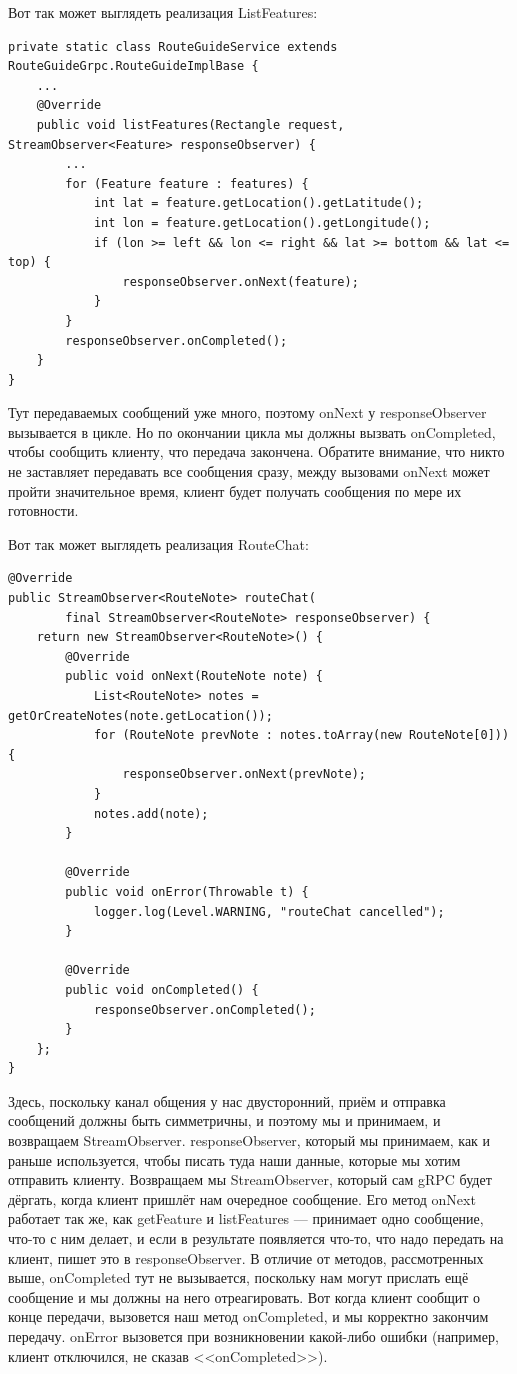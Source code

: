 \documentclass{../../text-style}
\begin{document}
Вот так может выглядеть реализация ListFeatures:

\begin{verbatim}
private static class RouteGuideService extends RouteGuideGrpc.RouteGuideImplBase {
    ...
    @Override
    public void listFeatures(Rectangle request, StreamObserver<Feature> responseObserver) {
        ...
        for (Feature feature : features) {
            int lat = feature.getLocation().getLatitude();
            int lon = feature.getLocation().getLongitude();
            if (lon >= left && lon <= right && lat >= bottom && lat <= top) {
                responseObserver.onNext(feature);
            }
        }
        responseObserver.onCompleted();
    }
}
\end{verbatim}

Тут передаваемых сообщений уже много, поэтому onNext у responseObserver вызывается в цикле. Но по окончании цикла мы должны вызвать onCompleted, чтобы сообщить клиенту, что передача закончена. Обратите внимание, что никто не заставляет передавать все сообщения сразу, между вызовами onNext может пройти значительное время, клиент будет получать сообщения по мере их готовности.

Вот так может выглядеть реализация RouteChat:

\begin{verbatim}
@Override
public StreamObserver<RouteNote> routeChat(
        final StreamObserver<RouteNote> responseObserver) {
    return new StreamObserver<RouteNote>() {
        @Override
        public void onNext(RouteNote note) {
            List<RouteNote> notes = getOrCreateNotes(note.getLocation());
            for (RouteNote prevNote : notes.toArray(new RouteNote[0])) {
                responseObserver.onNext(prevNote);
            }
            notes.add(note);
        }

        @Override
        public void onError(Throwable t) {
            logger.log(Level.WARNING, "routeChat cancelled");
        }

        @Override
        public void onCompleted() {
            responseObserver.onCompleted();
        }
    };
}
\end{verbatim}

Здесь, поскольку канал общения у нас двусторонний, приём и отправка сообщений должны быть симметричны, и поэтому мы и принимаем, и возвращаем StreamObserver. responseObserver, который мы принимаем, как и раньше используется, чтобы писать туда наши данные, которые мы хотим отправить клиенту. Возвращаем мы StreamObserver, который сам gRPC будет дёргать, когда клиент пришлёт нам очередное сообщение. Его метод onNext работает так же, как getFeature и listFeatures --- принимает одно сообщение, что-то с ним делает, и если в результате появляется что-то, что надо передать на клиент, пишет это в responseObserver. В отличие от методов, рассмотренных выше, onCompleted тут не вызывается, поскольку нам могут прислать ещё сообщение и мы должны на него отреагировать. Вот когда клиент сообщит о конце передачи, вызовется наш метод onCompleted, и мы корректно закончим передачу. onError вызовется при возникновении какой-либо ошибки (например, клиент отключился, не сказав <<onCompleted>>).
\end{document}
